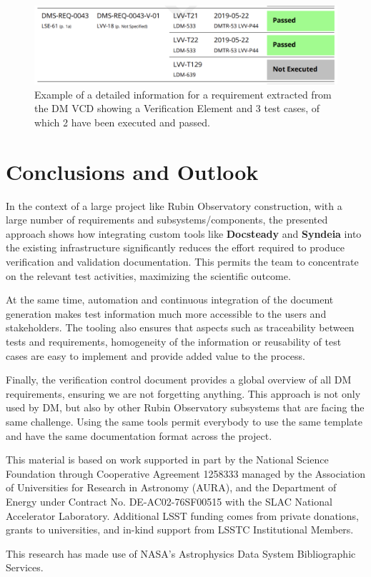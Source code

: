 \begin{figure}
\begin{center}
\includegraphics[width=\textwidth]{imgs/VCDdetail.png}
 \caption{Example of a detailed information for a requirement extracted from the DM VCD 
 showing a Verification Element and 3 test cases, of which 2 have been executed and passed.}
 \label{fig:vcddetail}
\end{center}
\end{figure}


\section{Conclusions and Outlook}

In the context of a large project like Rubin Observatory construction, with a large number of requirements
and subsystems/components, the presented approach shows how integrating custom tools like \textbf{Docsteady}
and \textbf{Syndeia} into the existing infrastructure significantly reduces the effort
required to produce verification and validation documentation.
This permits the team to concentrate on the relevant test activities, maximizing the scientific outcome.

At the same time, automation and continuous integration of the document generation makes test information
much more accessible to the users and stakeholders.
The tooling also ensures that aspects such as traceability between tests and requirements, homogeneity of the information
or reusability of test cases are easy to implement and provide added value to the process.

Finally, the verification control document provides a global overview of all DM requirements, ensuring we are not forgetting anything.
This approach is not only used by DM, but also by other Rubin Observatory subsystems that are facing the same challenge.
Using the same tools permit everybody to use the same template and have the same documentation format across the project.

\acknowledgments
This material is based on work supported in part by the  {National Science Foundation} through Cooperative Agreement 1258333 managed by the  {Association of Universities for Research in Astronomy} ({AURA}), and the  {Department of Energy} under  {Contract} No.  {DE}-AC02-76SF00515 with the  {SLAC} National Accelerator Laboratory. Additional LSST funding comes from private donations, grants to universities, and in-kind support from LSSTC Institutional Members.

This research has made use of  NASA's Astrophysics Data System Bibliographic Services.
